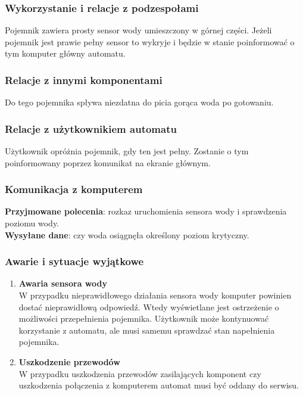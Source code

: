 \documentclass[12pt,a4paper,notitlepage]{article}
\begin{document}
\subsubsection{Wykorzystanie i relacje z podzespołami}
Pojemnik zawiera prosty sensor wody umieszczony w górnej części. Jeżeli pojemnik jest prawie pełny sensor to wykryje i będzie w stanie poinformować o tym komputer główny automatu.

\subsubsection{Relacje z innymi komponentami}
Do tego pojemnika spływa niezdatna do picia gorąca woda po gotowaniu.

\subsubsection{Relacje z użytkownikiem automatu}
Użytkownik opróżnia pojemnik, gdy ten jest pełny. Zostanie o tym poinformowany poprzez komunikat na ekranie głównym.

\subsubsection{Komunikacja z komputerem}
\textbf{Przyjmowane polecenia}: rozkaz uruchomienia sensora wody i sprawdzenia poziomu wody.\\
\textbf{Wysyłane dane}: czy woda osiągnęła określony poziom krytyczny.

\subsubsection{Awarie i sytuacje wyjątkowe}
\begin{enumerate}
  \item \textbf{Awaria sensora wody }\\
W przypadku nieprawidłowego działania sensora wody komputer powinien dostać nieprawidłową odpowiedź. Wtedy wyświetlane jest ostrzeżenie o możliwości przepełnienia pojemnika. Użytkownik może kontynuować korzystanie z automatu, ale musi samemu sprawdzać stan napełnienia pojemnika.
  \item \textbf{Uszkodzenie przewodów}\\
W przypadku uszkodzenia przewodów zasilających komponent czy uszkodzenia połączenia z komputerem automat musi być oddany do serwisu.
\end{enumerate}
\end{document}
